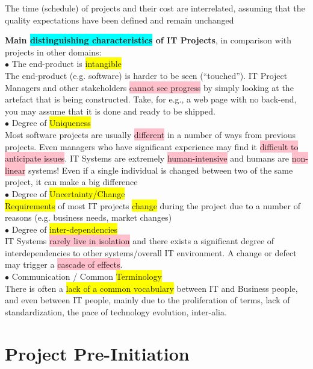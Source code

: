 \documentclass[]{project_plan}
\newcommand{\bulletPoint}{\hspace{-3.1pt}$\bullet$ \hspace{5pt}}
\begin{document}
The time (schedule) of projects and their cost are interrelated, assuming that
the quality expectations have been defined and remain unchanged

\textbf{Main \colorbox{cyan}{distinguishing characteristics} of IT Projects}, in comparison with projects in other domains:\\
\bulletPoint The end-product is \colorbox{yellow}{intangible}\\
The end-product (e.g. software) is harder to be seen (“touched”). IT Project
Managers and other stakeholders \colorbox{pink}{cannot see progress} by simply looking at the
artefact that is being constructed. Take, for e.g., a web page with no back-end,
you may assume that it is done and ready to be shipped.\\
\bulletPoint Degree of \colorbox{yellow}{Uniqueness}\\
Most software projects are usually \colorbox{pink}{different} in a number of ways from previous
projects. Even managers who have significant experience may find it \colorbox{pink}{difficult to
  anticipate issues}. IT Systems are extremely \colorbox{pink}{human-intensive} and humans are
\colorbox{pink}{non-linear} systems! Even if a single individual is changed between two of the
same project, it can make a big difference\\
\bulletPoint Degree of \colorbox{yellow}{Uncertainty/Change}\\
\colorbox{yellow}{Requirements} of most IT projects \colorbox{yellow}{change} during the project due to a number of
reasons (e.g. business needs, market changes)\\
\bulletPoint Degree of \colorbox{yellow}{inter-dependencies}\\
IT Systems \colorbox{pink}{rarely live in isolation} and there exists a significant degree of
interdependencies to other systems/overall IT environment. A change or defect
may trigger a \colorbox{pink}{cascade of effects}.\\
\bulletPoint Communication / Common \colorbox{yellow}{Terminology}\\
There is often a \colorbox{yellow}{lack of a common vocabulary} between IT and Business people,
and even between IT people, mainly due to the proliferation of terms, lack of
standardization, the pace of technology evolution, inter-alia.\\

\chapter{Project Pre-Initiation}
\end{document}
